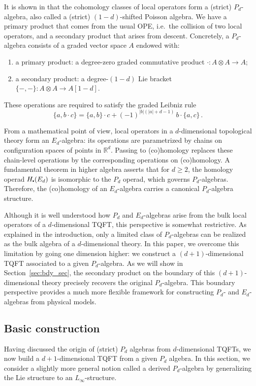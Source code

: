\documentclass[11pt]{article}
\newcommand\sbullet[1][.5]{\mathbin{\vcenter{\hbox{\scalebox{#1}{$\bullet$}}}}}
\numberwithin{equation}{section}
\begin{document}
It is shown in \cite{beem2020secondary} that the cohomology classes of local operators form a (strict) $P_d$-algebra, also called a (strict) $(1-d)$-shifted Poisson algebra. We have a primary product that comes from the usual OPE, i.e.\ the collision of two local operators, and a secondary product that arises from descent. Concretely, a $P_d$-algebra consists of a graded vector space $A$ endowed with:
\begin{enumerate}
	\item a primary product: a degree-zero graded commutative product $\cdot: A\otimes A \to A$;
	\item a secondary product: a degree-$(1-d)$ Lie bracket $\{-,-\}:A\otimes A \to A[1-d]$.
\end{enumerate}
These operations are required to satisfy the graded Leibniz rule
\begin{equation}
	\{a,b\cdot c\} = \{a,b\}\cdot c + (-1)^{|b|(|a| + d-1)}\,b\cdot\{a,c\}\,.
\end{equation}

From a mathematical point of view, local operators in a $d$-dimensional topological theory form an $E_d$-algebra: its operations are parametrized by chains on configuration spaces of points in $\mathbb{R}^d$. Passing to (co)homology replaces these chain-level operations by the corresponding operations on (co)homology. A fundamental theorem in higher algebra asserts that for $d\ge 2$, the homology operad $H_{\sbullet}(E_d)$ is isomorphic to the $P_d$ operad, which governs $P_d$-algebras. Therefore, the (co)homology of an $E_d$-algebra carries a canonical $P_d$-algebra structure.

Although it is well understood how $P_d$ and $E_d$-algebras arise from the bulk local operators of a $d$-dimensional TQFT, this perspective is somewhat restrictive. As explained in the introduction, only a limited class of $P_d$-algebras can be realized as the bulk algebra of a $d$-dimensional theory. In this paper, we overcome this limitation by going one dimension higher: we construct a $(d+1)$-dimensional TQFT associated to a given $P_d$-algebra. As we will show in Section~\ref{sec:bdy_sec}, the secondary product on the boundary of this $(d+1)$-dimensional theory precisely recovers the original $P_d$-algebra. This boundary perspective provides a much more flexible framework for constructing $P_d$- and $E_d$-algebras from physical models.

	
	\subsection{Basic construction}
	\label{sec:top_Pois_sig}
	Having discussed the origin of (strict) $P_d$ algebras from $d$-dimensional TQFTs, we now build a $d+1$-dimensional TQFT from a given $P_d$ algebra. In this section, we consider a slightly more general notion called a derived $P_d$-algebra by generalizing the Lie structure to an $L_\infty$-structure.
	
\end{document}
